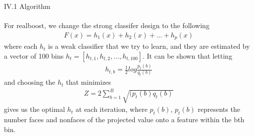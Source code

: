 \documentclass[12pt]{article}
\newenvironment{p3}[2][IV Realboost for Face Detection]{\begin{trivlist}
\item[\hskip \labelsep {\bfseries #1}\hskip \labelsep {\bfseries #2}]}{\end{trivlist}}
\begin{document}
\begin{p3}{}
\item{IV.1 Algorithm\\\\}
For realboost, we change the strong classifer design to the following
\begin{align*}
	F(x) = h_1(x) + h_2(x) + ... + h_p(x)
\end{align*}
where each $h_t$ is a weak classifier that we try to learn, and they are estimated by a vector of 100 bins $h_t = [h_{t, 1}, h_{t, 2}, ..., h_{t, 100}]$. It can be shown that letting
\begin{align*}
	h_{t, b} = \frac{1}{2}log\frac{p_t(b)}{q_t(b)}
\end{align*}
and choosing the $h_t$ that minimizes
\begin{align*}
	Z = 2\sum_{b=1}^B\sqrt{(p_t(b)q_t(b)}
\end{align*}
gives us the optimal $h_t$ at each iteration, where $p_t(b)$, $p_t(b)$ represents the number faces and nonfaces of the projected value onto a feature within the bth bin.


\end{p3}
\end{document}
